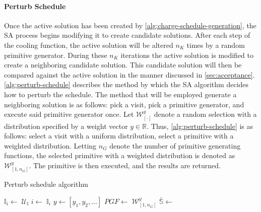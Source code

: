 \documentclass[energies,article,submit,moreauthors]{Definitions/mdpi}
\newcommand{\I}{\mathbb{I}}                 %
\newcommand{\C}{\mathbb{C}}                 %
\newcommand{\U}{\mathcal{U}}                %
\newcommand{\W}{\mathcal{W}}                %
\newcommand{\Sol}{\mathbb{S}}               %
\begin{document}
\paragraph{Perturb Schedule}
\label{sec:tweak-schedule}
Once the active solution has been created by \ref{alg:charge-schedule-generation}, the SA process begins modifying it to
create candidate solutions. After each step of the cooling function, the active solution will be altered \(n_K\) times by
a random primitive generator. During these \(n_K\) iterations the active solution is modified to create a neighboring
candidate solution. This candidate solution will then be compared against the active solution in the manner discussed in
\ref{sec:acceptance}. \ref{alg:perturb-schedule} describes the method by which the SA algorithm decides how to perturb the
schedule. The method that will be employed generate a neighboring solution is as follows: pick a visit, pick a primitive
generator, and execute said primitive generator once. Let \(\W^y_{[\cdot]}\) denote a random selection with a distribution
specified by a weight vector \(y \in \mathbb{R}\). Thus, \ref{alg:perturb-schedule} is as follows: select a visit with a uniform
distribution, select a primitive with a weighted distribution. Letting \(n_G\) denote the number of primitive generating
functions, the selected primitive with a weighted distribution is denoted as \(\W^y_{[1, n_G]}\). The primitive is then
executed, and the results are returned.

\begin{algorithm}[H]
\scriptsize
\caption{Perturb schedule algorithm} \label{alg:perturb-schedule}

    \LinesNumbered
    \KwIn{$\Sol$}
    \KwOut{$\bar{\Sol}$}


    \Begin
    {
        $\I_i\leftarrow\; \U_{\I}$
        $i \leftarrow\; \I_i$
        $y \leftarrow [y_1, y_2, ...]$
        $PGF \leftarrow\; \W^y_{[1,n_G]}$
        $\bar{\Sol} \leftarrow$ \PGF{($i$, $\I$, $\C$)}
        \Return{($0, \bar{\I}$, $\bar{\C}$)}
    }
\end{algorithm}
\end{document}
